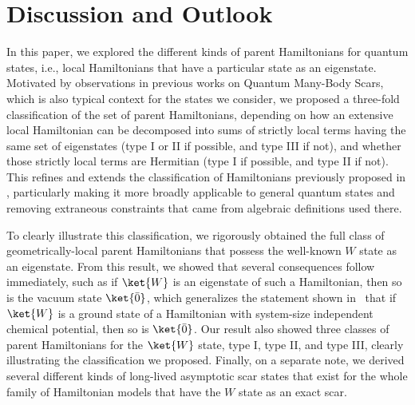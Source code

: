 \documentclass[prx,letterpaper,aps,superscriptaddress,floatfix,twocolumn,nofootinbib]{revtex4-2}
\theoremstyle{definition}
\begin{document}
\section{Discussion and Outlook}
\label{sec:discussion}
%
In this paper, we explored the different kinds of parent Hamiltonians for quantum states, i.e., local Hamiltonians that have a particular state as an eigenstate.
%
Motivated by observations in previous works on Quantum Many-Body Scars, which is also typical context for the states we consider, we proposed a three-fold classification of the set of parent Hamiltonians, depending on how an extensive local Hamiltonian can be decomposed into sums of strictly local terms having the same set of eigenstates (type I or II if possible, and type III if not), and whether those strictly local terms are Hermitian (type I if possible, and type II if not). 
%
This refines and extends the classification of Hamiltonians previously proposed in \cite{moudgalya2023exhaustive}, particularly making it more broadly applicable to general quantum states and removing extraneous constraints that came from algebraic definitions used there.
%

%
To clearly illustrate this classification, we rigorously obtained the full class of geometrically-local parent Hamiltonians that possess the well-known $W$ state as an eigenstate.
%
From this result, we showed that several consequences follow immediately, such as if $\ket{W}$ is an eigenstate of such a Hamiltonian, then so is the vacuum state $\ket{\bar{0}}$, which generalizes the statement shown in~\cite{gioia2024wstateuniqueground} that if $\ket{W}$ is a ground state of a Hamiltonian with system-size independent chemical potential, then so is $\ket{\bar{0}}$.
%
Our result also showed three classes of parent Hamiltonians for the $\ket{W}$ state, type I, type II, and type III, clearly illustrating the classification we proposed.
%
Finally, on a separate note, we derived several different kinds of long-lived asymptotic scar states that exist for the whole family of Hamiltonian models that have the $W$ state as an exact scar. 
%
\end{document}
